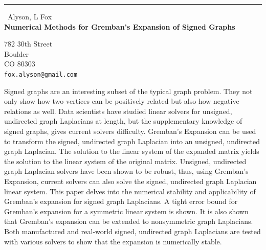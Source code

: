 \documentclass{report}
\begin{document}
\begin{center}
\rule{6in}{1pt} \
{\large Alyson, L Fox \\
{\bf Numerical Methods for Gremban's Expansion of Signed Graphs}}

782 30th Street \\ Boulder \\ CO 80303
\\
{\tt fox.alyson@gmail.com}\end{center}

Signed graphs are an interesting subset of the typical graph problem.
They not only show how two vertices can be positively related but also
how negative relations as well. Data scientists have studied linear
solvers for unsigned, undirected graph Laplacians at length, but the
supplementary knowledge of signed graphs, gives current solvers
difficulty. Gremban's Expansion \cite{GrembanPHD} can be used to
transform the signed, undirected graph Laplacian into an unsigned,
undirected graph Laplacian. The solution to the linear system of the
expanded matrix yields the solution to the linear system of the original
matrix. Unsigned, undirected graph Laplacian solvers have been shown to
be robust, thus, using Gremban's Expansion, current solvers can also
solve the signed, undirected graph Laplacian linear system. This paper
delves into the numerical stability and applicability of Gremban's
expansion for signed graph Laplacians. A tight error bound for Gremban's
expansion for a symmetric linear system is shown. It is also shown that
Gremban's expansion can be extended to nonsymmetric graph Laplacians.
Both manufactured and real-world signed, undirected graph Laplacians are
tested with various solvers to show that the expansion is numerically
stable.
\end{document}
